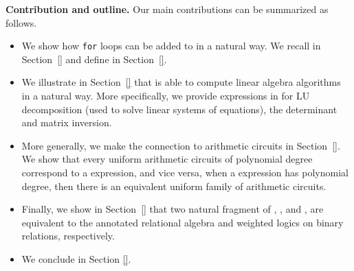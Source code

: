 \medskip
\noindent
\textbf{Contribution and outline.} Our main contributions can be summarized as follows.
\begin{itemize}[leftmargin=0.5cm]
	\item We show how \texttt{for} loops can be added to \lang in a natural way. We recall \lang in Section~\ref{} and define \langfor in Section~\ref{}.
	\item We illustrate in Section~\ref{} that \langfor is able to compute linear algebra algorithms in a natural way. More specifically, we provide expressions in \langfor for LU decomposition (used to solve linear systems of equations), the determinant and matrix inversion.
	\item More generally, we make the connection to arithmetic circuits in Section~\ref{}. We show that every  uniform arithmetic circuits of polynomial degree correspond to a \langfor expression, and vice versa, when a \langfor expression has polynomial degree, then there is an equivalent uniform family of arithmetic circuits.
	\item  Finally, we show in Section~\ref{} that two natural fragment of \langfor, \langsum, and \langprod, are equivalent to the annotated relational algebra and weighted logics on binary relations, respectively.
	\item We conclude in Section \ref{}.
\end{itemize}


